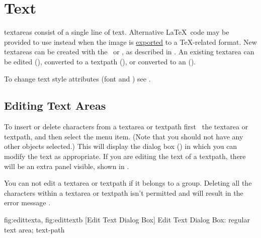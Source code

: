 
\chapter{Text}\label{sec:text}

\Glspl{textarea} consist of a single line of text. Alternative
\LaTeX\ code may be provided to use instead when the image
is \hyperref[sec:exportimage]{exported} to a \TeX-related format.
New \glspl{textarea} can be created with the
\texttool\ or \mathstool, as described in .
An existing \gls{textarea} can be edited (),
converted to a \gls{textpath} (), or
converted to an  ().

To change text style attributes (font and ) see
.

\section{Editing Text Areas}\label{sec:edittext}


To insert or delete characters from a \gls{textarea} or \gls{textpath} first
\select\ the \gls*{textarea} or \gls*{textpath}, and then
select the  menu item.  (Note
that you should not have any other \glspl{object} selected.) This
will display the  dialog box
() in which you can modify the text as
appropriate. If you are editing the text of a \gls{textpath}, there
will be an extra panel visible, shown in
.

\begin{information}
You can not edit a \gls*{textarea} or \gls*{textpath} if
it belongs to a \gls{group}. Deleting all the characters within a
\gls*{textarea} or \gls*{textpath} isn't permitted and will result
in the error message .
\end{information}

{
  {fig:edittexta}{}{},
  {fig:edittextb}{}{}
}
[Edit Text Dialog Box]
{Edit Text Dialog Box:  regular text area;
 text-path}

